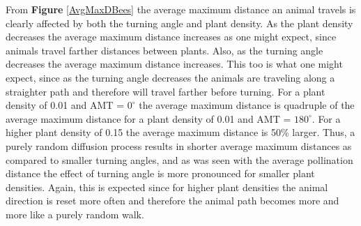 \documentclass[preprint,12pt]{elsarticle}
\numberwithin{equation}{subsection}
\begin{document}
From {\bf Figure} \ref{AvgMaxDBees} the average maximum distance an animal
travels is clearly affected by both the turning angle and plant density. As the
plant density decreases the average maximum distance increases as one might
expect, since animals travel farther distances between plants. Also, as the
turning angle decreases the average maximum distance increases. This too is what
one might expect, since as the turning angle decreases the animals are traveling
along a straighter path and therefore will travel farther before turning. For a
plant density of 0.01 and AMT = $0^\circ$ the average maximum distance is
quadruple of the average maximum distance for a plant density of 0.01 and AMT =
$180^\circ$. For a higher plant density of 0.15 the average maximum distance is
50\% larger. Thus, a purely random diffusion process results in shorter average
maximum distances as compared to smaller turning angles, and as was seen with
the average pollination distance the effect of turning angle is more pronounced
for smaller plant densities. Again, this is expected since for higher plant
densities the animal direction is reset more often and therefore the animal path
becomes more and more like a purely random walk.
\end{document}

